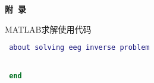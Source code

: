 \begin{center}
    { \hwfs\textbf{附~录} }
\end{center}

\begin{spacing}{1.5}
    {  \fangsong
    MATLAB求解使用代码
    }
    \begin{lstlisting}[language=MATLAB] 
 % writen by SU Jiaji @ April 2018, mainly for my thesis 
 about solving eeg inverse problem


 end
\end{lstlisting} 
\end{spacing}
\newpage